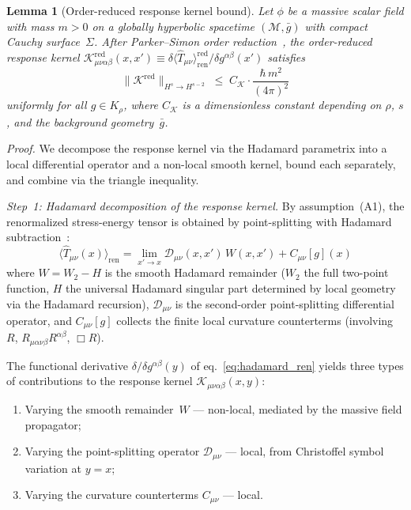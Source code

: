 \documentclass[12pt,a4paper]{article}
\newtheorem{lemma}{Lemma}
\begin{document}
\begin{lemma}[Order-reduced response kernel bound]
\label{lem:kernel_bound}
Let $\phi$ be a massive scalar field with mass $m > 0$ on a globally hyperbolic spacetime
$(\mathcal{M},\bar{g})$ with compact Cauchy surface~$\Sigma$. After Parker--Simon order
reduction~\emph{\cite{parker_simon}}, the order-reduced response kernel
$\mathcal{K}^{\mathrm{red}}_{\mu\nu\alpha\beta}(x,x')
\equiv \delta\langle\hat{T}_{\mu\nu}\rangle^{\mathrm{red}}_{\mathrm{ren}}/\delta g^{\alpha\beta}(x')$
satisfies
\begin{equation}
\bigl\|\mathcal{K}^{\mathrm{red}}\bigr\|_{H^s \to H^{s-2}}
\;\leq\; C_{\mathcal{K}} \cdot \frac{\hbar\, m^2}{(4\pi)^2}
\label{eq:kernel_bound}
\end{equation}
uniformly for all $g \in K_\rho$, where $C_{\mathcal{K}}$ is a dimensionless constant
depending on $\rho$, $s$, and the background geometry~$\bar{g}$.
\end{lemma}

\noindent\emph{Proof.} We decompose the response kernel via the Hadamard
parametrix into a local differential operator and a non-local smooth kernel,
bound each separately, and combine via the triangle inequality.

\smallskip\noindent\textit{Step~1: Hadamard decomposition of the response kernel.}
By assumption~(A1), the renormalized stress-energy tensor is obtained by
point-splitting with Hadamard subtraction~\cite{hollands_wald_wick}:
\begin{equation}
\langle\hat{T}_{\mu\nu}(x)\rangle_{\mathrm{ren}}
= \lim_{x'\to x}\mathcal{D}_{\mu\nu}(x,x')\,W(x,x') + C_{\mu\nu}[g](x)
\label{eq:hadamard_ren}
\end{equation}
where $W = W_2 - H$ is the smooth Hadamard remainder ($W_2$ the full
two-point function, $H$ the universal Hadamard singular part determined by
local geometry via the Hadamard recursion), $\mathcal{D}_{\mu\nu}$ is the
second-order point-splitting differential operator, and $C_{\mu\nu}[g]$ collects
the finite local curvature counterterms (involving $R$,
$R_{\mu\alpha\nu\beta}R^{\alpha\beta}$, $\Box R$).

The functional derivative $\delta/\delta g^{\alpha\beta}(y)$ of
eq.~\eqref{eq:hadamard_ren} yields three types of contributions to the
response kernel $\mathcal{K}_{\mu\nu\alpha\beta}(x,y)$:
\begin{enumerate}
\item[(I)] Varying the smooth remainder~$W$ --- non-local, mediated by the
massive field propagator;
\item[(II)] Varying the point-splitting operator $\mathcal{D}_{\mu\nu}$ ---
local, from Christoffel symbol variation at $y=x$;
\item[(III)] Varying the curvature counterterms $C_{\mu\nu}$ --- local.
\end{enumerate}
\end{document}
